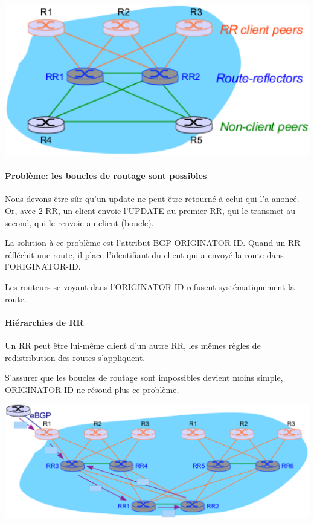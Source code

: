 \documentclass{report}
\begin{document}
\includegraphics[width=\textwidth]{rrdual.eps}

\paragraph{Problème: les boucles de routage sont possibles}

Nous devons être sûr qu'un update ne peut être retourné à celui qui
l'a anoncé. Or, avec 2 RR, un client envoie l'UPDATE au premier RR,
qui le transmet au second, qui le renvoie au client (boucle).

La solution à ce problème est l'attribut BGP ORIGINATOR-ID. Quand un
RR réfléchit une route, il place l'identifiant du client qui a
envoyé la route dans l'ORIGINATOR-ID.

Les routeurs se voyant dans l'ORIGINATOR-ID refusent systématiquement
la route.

\paragraph{Hiérarchies de RR}

Un RR peut être lui-même client d'un autre RR, les mêmes règles de
redistribution des routes s'appliquent.

S'assurer que les boucles de routage sont impossibles devient moins
simple, ORIGINATOR-ID ne résoud plus ce problème.

\includegraphics[width=\textwidth]{rrhierarchyloop.eps}
\end{document}
